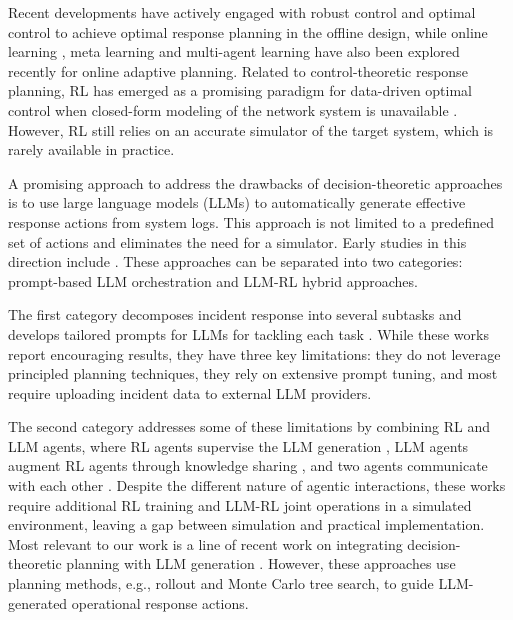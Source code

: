 \documentclass[runningheads,10pt]{llncs}
\begin{document}
Recent developments \cite{iannucci18mdp-cyber,miehling22control-cyber} have actively engaged with robust control and optimal control to achieve optimal response planning in the offline design, while online learning \cite{kim-tao25col,kim-tao25quantization}, meta learning \cite{tao23ztd} and multi-agent learning \cite{tao24col,tao22info} have also been explored recently for online adaptive planning. Related to control-theoretic response planning, RL has emerged as a promising paradigm for data-driven optimal control when closed-form modeling of the network system is unavailable \cite{tao22confluence}. However, RL still relies on an accurate simulator of the target system, which is rarely available in practice.

A promising approach to address the drawbacks of decision-theoretic approaches is to use large language models (LLMs) to automatically generate effective response actions from system logs. This approach is not limited to a predefined set of actions and eliminates the need for a simulator. Early studies in this direction include \cite{hamoun25llm-acd,guo25ircopilot,tao25deception,wang2026cybergym}. These approaches can be separated into two categories: prompt-based LLM orchestration and LLM-RL hybrid approaches. 

The first category decomposes incident response into several subtasks and develops tailored prompts for LLMs for tackling each task \cite{hamoun25llm-acd,guo25ircopilot}. While these works report encouraging results, they have three key limitations: they do not leverage principled planning techniques, they rely on extensive prompt tuning, and most require uploading incident data to external LLM providers.

The second category addresses some of these limitations by combining RL and LLM agents, where RL agents supervise the LLM generation \cite{keman24rl-mentor}, LLM agents augment RL agents through knowledge sharing \cite{lopes24hybrid-ai}, and two agents communicate with each other \cite{cardenas25llm4acd}. Despite the different nature of agentic interactions, these works require additional RL training and LLM-RL joint operations in a simulated environment, leaving a gap between simulation and practical implementation. Most relevant to our work is a line of recent work on integrating decision-theoretic planning with LLM generation \cite{kim26ndss,yiran26e2e-ir}. However, these approaches use planning methods, e.g., rollout and Monte Carlo tree search, to guide LLM-generated operational response actions.  
\end{document}
